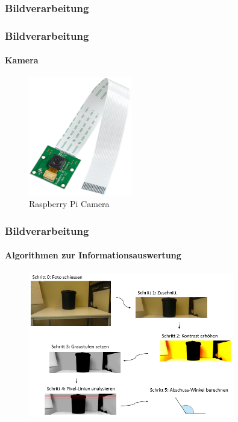 \subsubsection{Bildverarbeitung}
\begin{frame}
	\frametitle{Bildverarbeitung\hfill{}\footnotesize \group}
	\framesubtitle{Kamera}
	
	\begin{figure}
		\centering
		\includegraphics[width=0.4\textwidth]{../../fig/raspberry_pi_cam.png}
		\caption{Raspberry Pi Camera}
	\end{figure}
	
\end{frame}

\begin{frame}
	\frametitle{Bildverarbeitung\hfill{}\footnotesize \group}
	\framesubtitle{Algorithmen zur Informationsauswertung}
	
	\begin{figure}
		\centering
		\includegraphics[width=0.8\textwidth]{../../fig/ablauf-ortung-des-korbes-algorithmus.png}
	\end{figure}
	
	
\end{frame}

